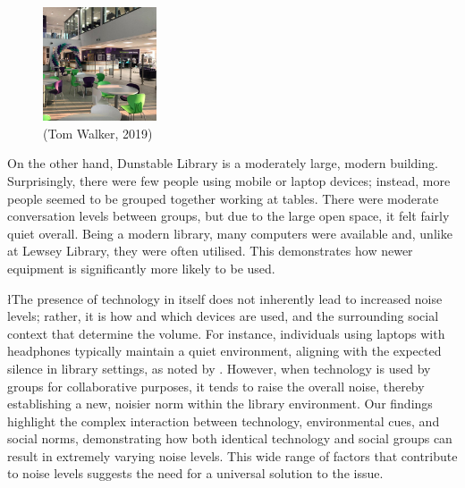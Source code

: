 \documentclass{novel}
\begin{document}
\begin{figure} 
\vspace{-\intextsep}
    \includegraphics[width=0.30\textwidth]{resources/dunstable.jpg}
\vspace*{-10mm}
    \caption*{{\scriptsize (Tom Walker, 2019)}}
\end{figure}
On the other hand, Dunstable Library is a moderately large, modern building. Surprisingly, there were few people using mobile or laptop devices; instead, more people seemed to be grouped together working at tables. There were moderate conversation levels between groups, but due to the large open space, it felt fairly quiet overall. Being a modern library, many computers were available and, unlike at Lewsey Library, they were often utilised. This demonstrates how newer equipment is significantly more likely to be used.

\l{T}he presence of technology in itself does not inherently lead to increased noise levels; rather, it is how and which devices are used, and the surrounding social context that determine the volume. For instance, individuals using laptops with headphones typically maintain a quiet environment, aligning with the expected silence in library settings, as noted by \cite{aarts_silence_2003}. However, when technology is used by groups for collaborative purposes, it tends to raise the overall noise, thereby establishing a new, noisier norm within the library environment. Our findings highlight the complex interaction between technology, environmental cues, and social norms, demonstrating how both identical technology and social groups can result in extremely varying noise levels. This wide range of factors that contribute to noise levels suggests the need for a universal solution to the issue.
\end{document}
